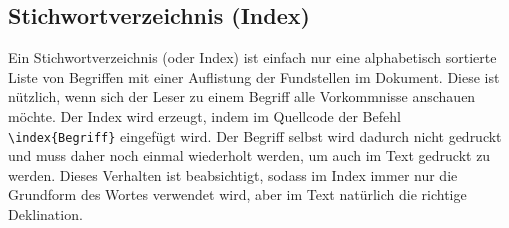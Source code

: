 \subsection{Stichwortverzeichnis (Index)}%
%
%
\label{sec:Index}
%
Ein Stichwortverzeichnis (oder
Index)
ist einfach nur eine alphabetisch sortierte Liste von Begriffen mit einer Auflistung der Fundstellen im Dokument.
Diese ist nützlich, wenn sich der Leser zu einem Begriff alle Vorkommnisse anschauen möchte.
Der Index wird erzeugt, indem im Quellcode der Befehl \verb+\index{Begriff}+
eingefügt wird. Der Begriff selbst wird dadurch nicht gedruckt und muss daher
noch einmal wiederholt werden, um auch im Text gedruckt zu werden. Dieses Verhalten
ist beabsichtigt, sodass im Index immer nur die Grundform des Wortes verwendet
wird, aber im Text natürlich die richtige Deklination.
